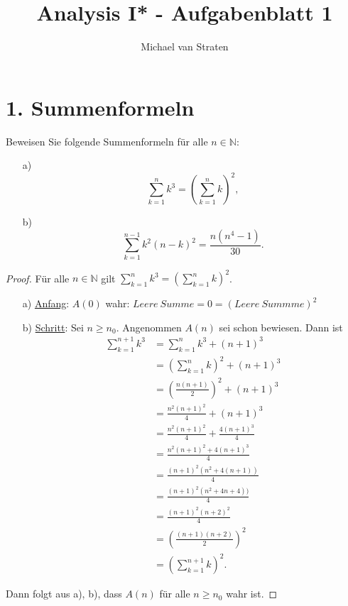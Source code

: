 \documentclass{exam}
\title{Analysis I* - Aufgabenblatt 1}
\author{Michael van Straten}
\begin{document}
\maketitle
\section*{1. Summenformeln}
Beweisen Sie folgende Summenformeln für alle $n \in \mathbb{N}$:
\begin{enumerate}
	\item[a)]
	      \[
		      \sum_{k = 1}^{n} k^3 = \left(\sum_{k = 1}^{n}k\right)^2,
	      \]
	\item[b)]
	      \[
		      \sum_{k = 1}^{n-1} k^2(n-k)^2 = \frac{n(n^4-1)}{30}.
	      \]
\end{enumerate}
\begin{proof}
	Für alle $n \in \mathbb{N}$ gilt $\sum_{k = 1}^{n} k^3 = \left(\sum_{k = 1}^{n}k\right)^2$.
	\begin{enumerate}
		\item[a)] \underline{Anfang}: $A(0)$ wahr: $Leere\ Summe = 0 = (Leere\ Summme)^2$
		\item[b)] \underline{Schritt}: Sei $n \ge n_0$. Angenommen $A(n)$ sei schon bewiesen.
		      Dann ist \begin{align}
			      \sum_{k = 1}^{n + 1} k^3 & = \sum_{k = 1}^{n}k^3 + (n + 1)^3                                           \\
			                               & = \left(\sum_{k = 1}^{n}k\right)^2 + (n + 1)^3 \tag{Gausische summenformel} \\
			                               & = \left(\frac{n(n+1)}{2}\right)^2 + (n + 1)^3                               \\
			                               & = \frac{n^2(n+1)^2}{4} + (n + 1)^3                                          \\
			                               & = \frac{n^2(n+1)^2}{4} + \frac{4(n + 1)^3}{4}                               \\
			                               & = \frac{n^2(n+1)^2 + 4(n + 1)^3}{4}                                         \\
			                               & = \frac{(n+1)^2(n^2 + 4(n + 1))}{4}                                         \\
			                               & = \frac{(n+1)^2(n^2 + 4n + 4))}{4}                                          \\
			                               & = \frac{(n+1)^2(n +2)^2}{4}                                                 \\
			                               & = \left(\frac{(n+1)(n +2)}{2}\right)^2                                      \\
			                               & = \left(\sum_{k=1}^{n+1}k\right)^2.
		      \end{align}
	\end{enumerate}
	Dann folgt aus a), b), dass $A(n)$ für alle $n \ge n_0$ wahr ist.
\end{proof}
\end{document}
